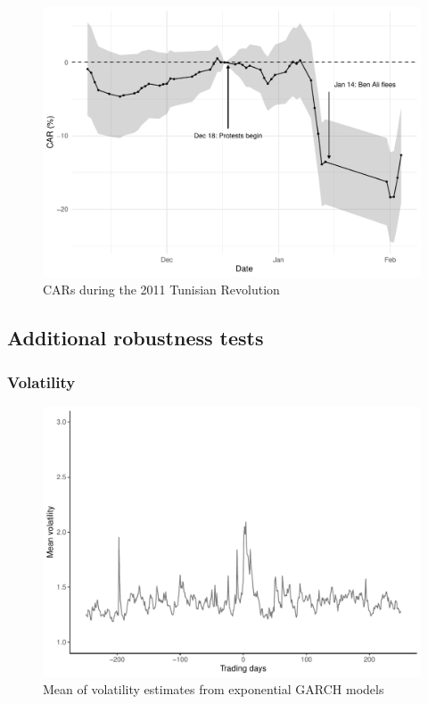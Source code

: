 \documentclass[12pt,final,fleqn]{article}
\theoremstyle{plain}
\begin{document}
\begin{figure}[!ht]
\centering
\includegraphics[scale=0.8]{../figs/tunisia-2011.pdf}
\caption{CARs during the 2011 Tunisian Revolution}
\label{fig:CAR-Egypt}
\end{figure}

\clearpage
\pagebreak
\newpage

\subsection{Additional robustness tests}

\subsubsection{Volatility}

\begin{figure}[H]
\includegraphics[scale = 0.75]{../figs/mean-volatility-egarch.pdf}
\caption{Mean of volatility estimates from exponential GARCH models}
\label{fig:egarch}
\end{figure}
\end{document}
